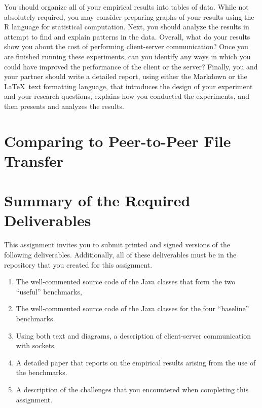 You should organize all of your empirical results into tables of data. While not absolutely required,
you may consider preparing graphs of your results using the R language for statistical computation. Next, you should
analyze the results in attempt to find and explain patterns in the data. Overall, what do your results show you about
the cost of performing client-server communication? Once you are finished running these experiments, can you identify
any ways in which you could have improved the performance of the client or the server? Finally, you and your partner
should write a detailed report, using either the Markdown or the \LaTeX~text formatting language, that introduces the
design of your experiment and your research questions, explains how you conducted the experiments, and then presents and
analyzes the results.

\section*{Comparing to Peer-to-Peer File Transfer}

\section*{Summary of the Required Deliverables}

This assignment invites you to submit printed and signed versions of the following deliverables. Additionally,
all of these deliverables must be in the repository that you created for this assignment.

\begin{enumerate}

    \item The well-commented source code of the Java classes that form the two ``useful'' benchmarks,

    \item The well-commented source code of the Java classes for the four ``baseline'' benchmarks.

    \item Using both text and diagrams, a description of client-server communication with sockets.

    \item A detailed paper that reports on the empirical results arising from the use of the benchmarks.

    \item A description of the challenges that you encountered when completing this assignment.

\end{enumerate}

